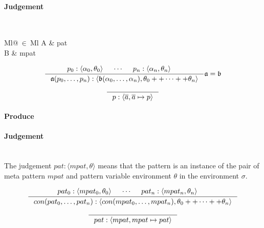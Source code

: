 \clearpage

\paragraph{Judgement} \\
\indent\begin{tabular}{Ml@{$\ \in\ $}Ml}
  A & pat\\
  B & mpat
\end{tabular}

\[
\inference
{
  p_0 : \langle \alpha_0, \theta_0 \rangle &
  \cdots &
  p_n : \langle \alpha_n, \theta_n \rangle &
}
{
  \mathfrak{a} (p_0, \ldots, p_n) :
  \langle \mathfrak{b} (\alpha_0, \ldots, \alpha_n), \theta_0 ++ \cdots ++
  \theta_n \rangle
}
{
  \mathfrak{a} = \mathfrak{b}
}
\]

\[
\inference
{
}
{
  p : \langle \overline{a}, \overline{a} \mapsto p \rangle
}
\]


\paragraph{Produce}

\paragraph{Judgement} \\

The judgement $pat : \langle mpat, \theta \rangle$ means that the pattern is an
instance of the pair of meta pattern $mpat$ and pattern variable environment
$\theta$ in the environment $\sigma$.


\[
\inference
{
  pat_0 : \langle mpat_0, \theta_0 \rangle &
  \cdots &
  pat_n : \langle mpat_n, \theta_n \rangle &
}
{
  con (pat_0, \ldots, pat_n) :
  \langle con (mpat_0, \ldots, mpat_n), \theta_0 ++ \cdots ++
  \theta_n \rangle
}
\]

\[
\inference
{
}
{
  pat : \langle mpat, mpat \mapsto pat \rangle
}
\]

\clearpage

